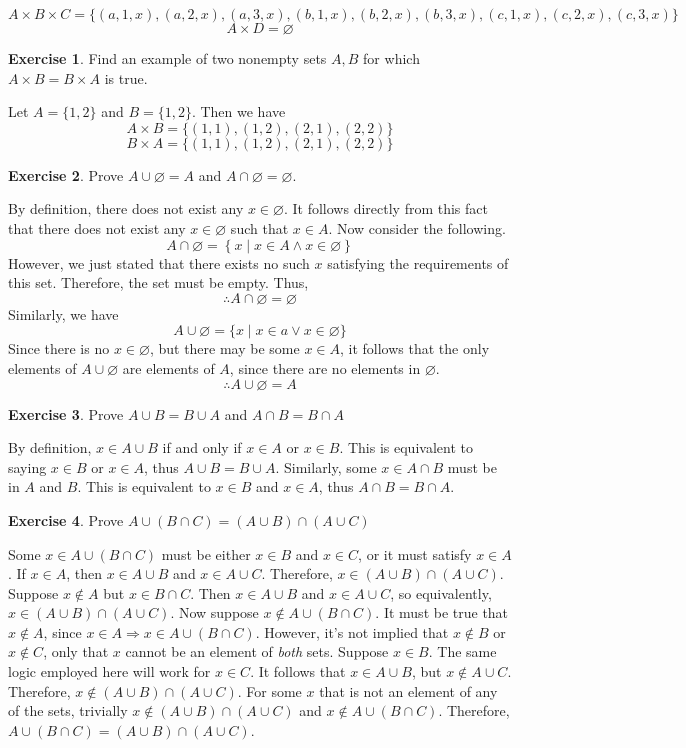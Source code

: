 \documentclass{article}
\theoremstyle{definition}
\newtheorem{environment}{Exercise}
\newenvironment{exercise}
    {\begin{mdframed}\begin{environment}}
    {\end{environment}\end{mdframed}}
\begin{document}
\[
    A\times B\times C = \{ (a,1,x),(a,2,x),(a,3,x),(b,1,x),(b,2,x),(b,3,x),(c,1,x),(c,2,x),(c,3,x) \} 
\]
\[
    A\times D=\varnothing 
\]
\begin{exercise}
    Find an example of two nonempty sets \(A,B\) for which \(A\times B=B\times A\) is true.
\end{exercise}
Let \(A=\{ 1,2 \} \) and \(B=\{ 1,2 \} \). Then we have
\[
    A\times B = \{(1,1),(1,2),(2,1),(2,2)\}
\]
\[
    B\times A=\{ (1,1),(1,2),(2,1),(2,2) \} 
\]
\begin{exercise}
    Prove \(A \cup \varnothing =A\) and \(A\cap \varnothing =\varnothing \).
\end{exercise}
By definition, there does not exist any \(x\in\varnothing \). It follows directly from this fact that there does not exist any \(x\in\varnothing \) such that \(x\in A\). Now consider the following.
\[
    A \cap \varnothing =\left\{ x\mid x\in A \land x\in \varnothing  \right\} 
\]
However, we just stated that there exists no such \(x\) satisfying the requirements of this set. Therefore, the set must be empty. Thus,
\[
   \therefore A \cap \varnothing =\varnothing 
\]
Similarly, we have
\[
    A \cup  \varnothing =\{ x\mid x\in a \lor x\in \varnothing  \} 
\]
Since there is no \(x\in \varnothing \), but there may be some \(x\in A\), it follows that the only elements of \(A \cup \varnothing \) are elements of \(A\), since there are no elements in \(\varnothing \). 
\[
    \therefore A \cup \varnothing =A
\]
\begin{exercise}
    Prove \(A\cup B=B\cup A\) and \(A\cap B=B\cap A\)
\end{exercise}
By definition, \(x\in A \cup B\) if and only if \(x\in A\) or \(x\in B\). This is equivalent to saying \(x\in B\) or \(x\in A\), thus \(A \cup B=B\cup A\). Similarly, some \(x\in A\cap B\) must be in \(A\) and \(B\). This is equivalent to \(x\in B\) and \(x\in A\), thus \(A \cap B=B\cap A\).
\begin{exercise}
    Prove \(A \cup (B\cap C)=(A\cup B)\cap (A \cup C)\)     
\end{exercise}
Some \(x\in A\cup (B\cap C)\) must be either \(x\in B\) and \(x\in C\), or it must satisfy \(x\in A\). If \(x\in A\), then \(x\in A\cup B\) and \(x\in A \cup C\). Therefore, \(x\in (A\cup B)\cap (A\cup C)\). Suppose \(x\notin A\) but \(x \in B\cap C\). Then \(x\in A\cup B\) and \(x\in A\cup C\), so equivalently, \(x\in (A\cup B)\cap (A\cup C)\). Now suppose \(x\notin A\cup (B\cap C)\). It must be true that \(x\notin A\), since \(x\in A \Longrightarrow x\in A\cup (B\cap C)\). However, it's not implied that \(x\notin B\) or \(x\notin C\), only that \(x\) cannot be an element of \emph{both} sets. Suppose \(x\in B\). The same logic employed here will work for \(x\in C\). It follows that \(x\in A\cup B\), but \(x\notin A\cup C\). Therefore, \(x\notin (A\cup B)\cap (A\cup C)\). For some \(x\) that is not an element of any of the sets, trivially \(x\notin (A\cup B)\cap (A\cup C)\) and \(x\notin A\cup (B\cap C)\). Therefore, \(A\cup (B\cap C)=(A\cup B)\cap (A\cup C)\).
\end{document}
